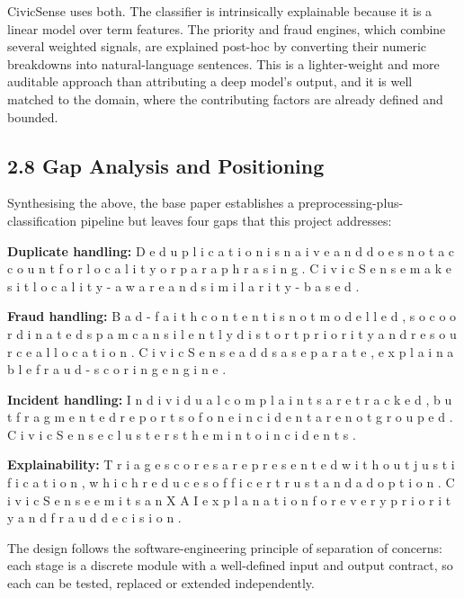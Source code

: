 \documentclass[10pt,letterpaper,oneside]{article}\usepackage{geometry}\geometry{top=1in,bottom=1in,left=1in,right=1in,includeheadfoot}\usepackage{xcolor}\definecolor{color@navy}{HTML}{1F3B63}\definecolor{color@grey}{HTML}{404040}\definecolor{color@hdr}{HTML}{F2F4F7}\usepackage{titlesec}\titleformat{\section}  {\normalfont\huge\bfseries\color@navy}  {}{0pt}{\MakeUppercase}\titleformat{\subsection}  {\normalfont\Large\bfseries\color@navy}  {}{0pt}{}\titleformat{\subsubsection}  {\normalfont\large\bfseries\color@navy}  {}{0pt}{}\titlespacing*{\section}{0pt}{14pt}{6pt}\titlespacing*{\subsection}{0pt}{10pt}{4pt}\titlespacing*{\subsubsection}{0pt}{8pt}{3pt}\setlength{\parindent}{0pt}\setlength{\parskip}{0.6em}\parindent=0pt\usepackage{enumitem}\setlist{nosep,leftmargin=*,itemsep=0pt,topsep=2pt,partopsep=0pt}\usepackage{array}\usepackage{booktabs}\usepackage{caption}\captionsetup{font={small,it},labelfont={bf},labelsep=period,  parskip=2pt,skip=4pt,list=no}\captionsetup[table]{labelfont={bf,small,color@navy},name=Table}\usepackage{graphicx}\usepackage{verbatim}\usepackage{ragged2e}\usepackage{longtable}\usepackage{tabularx}\usepackage{multirow}\usepackage{colortbl}\definecolor{rowshade}{HTML}{F2F4F7}\usepackage{tikz}\usetikzlibrary{positioning,calc}\usepackage[hidelinks]{hyperref}\hypersetup{colorlinks=true,linkcolor=color@navy,urlcolor=color@navy}\pagestyle{fancy}\fancyhf{}\renewcommand{\headrulewidth}{0.4pt}\fancyhead[L]{\small\color@navy CivicSense — Project Report}\fancyhead[R]{\small\color@grey October 11, 2026}\fancyfoot[C]{\small\color@grey An Integrated Intelligent Triage Pipelin}\fancyfoot[R]{\small\color@grey Page \thepage}\usepackage{setspace}\setstretch{1.15}\AtBeginDocument{  \hypersetup{pdftitle={An Integrated Intelligent Triage Pipeline for AI-Enhanced Citizen Complaint Management},    pdfauthor={CivicSense Project Team},    pdfsubject={Project Report},    pdfkeywords={smart cities, NLP, complaint management, e-governance},    pdfcreator={CivicSense Project Team}  }}
\begin{document}
CivicSense uses both. The classifier is intrinsically explainable because it is a linear model over term features. The priority and fraud engines, which combine several weighted signals, are explained post-hoc by converting their numeric breakdowns into natural-language sentences. This is a lighter-weight and more auditable approach than attributing a deep model’s output, and it is well matched to the domain, where the contributing factors are already defined and bounded.

\subsection*{2.8 Gap Analysis and Positioning}
Synthesising the above, the base paper establishes a preprocessing-plus-classification pipeline but leaves four gaps that this project addresses:

\item \textbf{Duplicate handling: } D e d u p l i c a t i o n   i s   n a i v e   a n d   d o e s   n o t   a c c o u n t   f o r   l o c a l i t y   o r   p a r a p h r a s i n g .   C i v i c S e n s e   m a k e s   i t   l o c a l i t y - a w a r e   a n d   s i m i l a r i t y - b a s e d .

\item \textbf{Fraud handling: } B a d - f a i t h   c o n t e n t   i s   n o t   m o d e l l e d ,   s o   c o o r d i n a t e d   s p a m   c a n   s i l e n t l y   d i s t o r t   p r i o r i t y   a n d   r e s o u r c e   a l l o c a t i o n .   C i v i c S e n s e   a d d s   a   s e p a r a t e ,   e x p l a i n a b l e   f r a u d - s c o r i n g   e n g i n e .

\item \textbf{Incident handling: } I n d i v i d u a l   c o m p l a i n t s   a r e   t r a c k e d ,   b u t   f r a g m e n t e d   r e p o r t s   o f   o n e   i n c i d e n t   a r e   n o t   g r o u p e d .   C i v i c S e n s e   c l u s t e r s   t h e m   i n t o   i n c i d e n t s .

\item \textbf{Explainability: } T r i a g e   s c o r e s   a r e   p r e s e n t e d   w i t h o u t   j u s t i f i c a t i o n ,   w h i c h   r e d u c e s   o f f i c e r   t r u s t   a n d   a d o p t i o n .   C i v i c S e n s e   e m i t s   a n   X A I   e x p l a n a t i o n   f o r   e v e r y   p r i o r i t y   a n d   f r a u d   d e c i s i o n .

The design follows the software-engineering principle of separation of concerns: each stage is a discrete module with a well-defined input and output contract, so each can be tested, replaced or extended independently.
\end{document}
